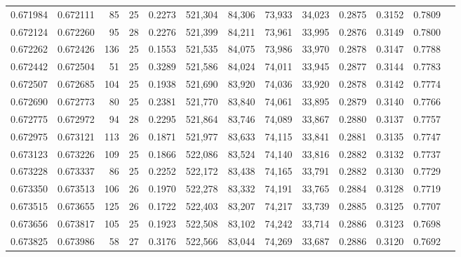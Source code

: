\begin{tabular}{rrrrrrrrrrrrr}
0.671984 & 0.672111 &    85 &  25 &                                     0.2273 & 521,304 &  84,306 &  73,933 &  34,023 & 0.2875 & 0.3152 & 0.7809 \\
0.672124 & 0.672260 &    95 &  28 &                                     0.2276 & 521,399 &  84,211 &  73,961 &  33,995 & 0.2876 & 0.3149 & 0.7800 \\
0.672262 & 0.672426 &   136 &  25 &                                     0.1553 & 521,535 &  84,075 &  73,986 &  33,970 & 0.2878 & 0.3147 & 0.7788 \\
0.672442 & 0.672504 &    51 &  25 &                                     0.3289 & 521,586 &  84,024 &  74,011 &  33,945 & 0.2877 & 0.3144 & 0.7783 \\
0.672507 & 0.672685 &   104 &  25 &                                     0.1938 & 521,690 &  83,920 &  74,036 &  33,920 & 0.2878 & 0.3142 & 0.7774 \\
0.672690 & 0.672773 &    80 &  25 &                                     0.2381 & 521,770 &  83,840 &  74,061 &  33,895 & 0.2879 & 0.3140 & 0.7766 \\
0.672775 & 0.672972 &    94 &  28 &                                     0.2295 & 521,864 &  83,746 &  74,089 &  33,867 & 0.2880 & 0.3137 & 0.7757 \\
0.672975 & 0.673121 &   113 &  26 &                                     0.1871 & 521,977 &  83,633 &  74,115 &  33,841 & 0.2881 & 0.3135 & 0.7747 \\
0.673123 & 0.673226 &   109 &  25 &                                     0.1866 & 522,086 &  83,524 &  74,140 &  33,816 & 0.2882 & 0.3132 & 0.7737 \\
0.673228 & 0.673337 &    86 &  25 &                                     0.2252 & 522,172 &  83,438 &  74,165 &  33,791 & 0.2882 & 0.3130 & 0.7729 \\
0.673350 & 0.673513 &   106 &  26 &                                     0.1970 & 522,278 &  83,332 &  74,191 &  33,765 & 0.2884 & 0.3128 & 0.7719 \\
0.673515 & 0.673655 &   125 &  26 &                                     0.1722 & 522,403 &  83,207 &  74,217 &  33,739 & 0.2885 & 0.3125 & 0.7707 \\
0.673656 & 0.673817 &   105 &  25 &                                     0.1923 & 522,508 &  83,102 &  74,242 &  33,714 & 0.2886 & 0.3123 & 0.7698 \\
0.673825 & 0.673986 &    58 &  27 &                                     0.3176 & 522,566 &  83,044 &  74,269 &  33,687 & 0.2886 & 0.3120 & 0.7692 \\

\end{tabular}
